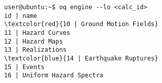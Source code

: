 \begin{Verbatim}[frame=single, commandchars=\\\{\}, fontsize=\small]
user@ubuntu:~$ oq engine --lo <calc_id>
id | name
\textcolor{red}{10 | Ground Motion Fields}
11 | Hazard Curves
12 | Hazard Maps
13 | Realizations
\textcolor{blue}{14 | Earthquake Ruptures}
15 | Events
16 | Uniform Hazard Spectra
\end{Verbatim}
